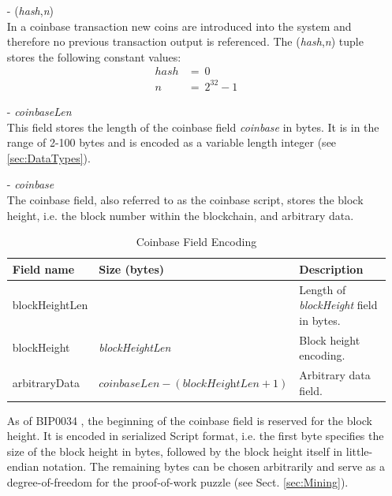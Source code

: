 \begin{itemize}
\item[-] (\textit{hash},\textit{n})~\\
In a coinbase transaction new coins are introduced into the system and therefore no previous transaction output is referenced. The (\textit{hash},\textit{n}) tuple stores the following constant values:
\begin{equation}
\begin{split}
hash &=\ 0 \\
n &=\ 2^{32}-1
\end{split}
\end{equation}

\item[-] \textit{coinbaseLen}~\\
This field stores the length of the coinbase field \textit{coinbase} in bytes. It is in the range of 2-100 bytes and is encoded as a variable length integer (see \ref{sec:DataTypes}).

\item[-] \textit{coinbase}~\\
The coinbase field, also referred to as the coinbase script, stores the block height, i.e. the block number within the blockchain, and arbitrary data.~\\

\vspace{-10pt}
\begin{table}
	\centering
	\begin{tabularx}{0.888\textwidth}{| m{70pt} | >{\centering} m{80pt} | X |}
	\hline
	\textbf{Field name} &
	\textbf{Size (bytes)} &
	\textbf{Description} \\ \hline \hline
	
	blockHeightLen &
	1 &
	Length of \textit{blockHeight} field in bytes. \\ \hline
	
	blockHeight &
	\textit{blockHeightLen} &
	Block height encoding. \\ \hline
	
	arbitraryData &
	$\textit{coinbaseLen} - (\textit{blockHeightLen} + 1)$ &
	Arbitrary data field. \\ \hline
	
	\end{tabularx}
	\vspace{5pt}
	\caption{Coinbase Field Encoding}
	\label{tab:CoinbaseFieldEncoding}
\end{table}
\vspace{-20pt}

As of BIP0034 \cite{BIP0034}, the beginning of the coinbase field is reserved for the block height. It is encoded in serialized Script format, i.e. the first byte specifies the size of the block height in bytes, followed by the block height itself in little-endian notation. The remaining bytes can be chosen arbitrarily and serve as a degree-of-freedom for the proof-of-work puzzle (see Sect. \ref{sec:Mining}).
\end{itemize} 


